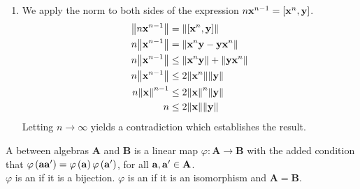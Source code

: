 \begin{solution}
\begin{enumerate}[label=\textbf{\roman*)}]
\begin{align*}
            \vb{x}^{n}\vb{y} - \vb{y} \vb{x}^{n} &= n \vb{x}^{n-1} \\
            \vb{0} \vb{y} - \vb{y} \vb{0} &= n \vb{x}^{n-1}\\
            \vb{0} &= n \vb{x}^{n-1} \\
            \vb{0} &= \vb{x}^{n-1}
        \end{align*}
        This contradiction establishes the result.
        \item We apply the norm to both sides of the expression \( n \vb{x}^{n-1} = \left[ \vb{x}^{n}, \vb{y} \right] \).
        \begin{align*}
            \norm{n \vb{x}^{n-1}} &= \norm{\left[ \vb{x}^{n}, \vb{y} \right]} \\
            n \norm{\vb{x}^{n-1}} &= \norm{\vb{x}^{n} \vb{y} - \vb{y} \vb{x}^{n}}\\
            n \norm{\vb{x}^{n-1}} & \le \norm{\vb{x}^{n} \vb{y}} +\norm{\vb{y} \vb{x}^{n}} \\
            n \norm{\vb{x}^{n-1}} & \le 2\norm{\vb{x}^{n}} \norm{\vb{y}} \\
            n \norm{\vb{x}}^{n-1} & \le 2 \norm{\vb{x}}^{n} \norm{\vb{y}} \\ 
            n &\le 2 \norm{\vb{x}} \norm{\vb{y}}
        \end{align*}
        Letting \( n \to \infty \) yields a contradiction which establishes the result.
    \end{enumerate}
\end{solution}


\begin{dfn}
    A  between algebras \( \mathbf{A} \) and \( \mathbf{B} \) is a linear map \( \varphi: \mathbf{A} \to \mathbf{B} \) with the added condition that \( \varphi \left( \vb{a} \vb{a}' \right) = \varphi \left( \vb{a} \right) \varphi \left( \vb{a}' \right) \), for all \( \vb{a}, \vb{a}' \in \mathbf{A} \). \\ 
    \( \varphi \) is an   if it is a bijection. \( \varphi \) is an  if it is an isomorphism and \( \mathbf{A} = \mathbf{B} \).
\end{dfn}

